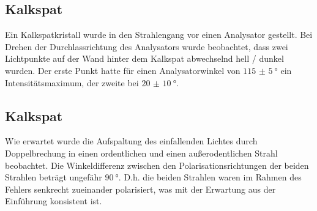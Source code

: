 \newpage
{}

\subsection{Kalkspat}
Ein Kalkspatkristall wurde in den Strahlengang vor einen Analysator gestellt. Bei Drehen der Durchlassrichtung des Analysators wurde beobachtet, dass zwei Lichtpunkte auf der Wand hinter dem Kalkspat abwechselnd hell / dunkel wurden. Der erste Punkt hatte für einen Analysatorwinkel von $\SI{115(5)}{\degree}$ ein Intensitätsmaximum, der zweite bei $\SI{20(10)}{\degree}$. 
\newpage
{}
\subsection{Kalkspat}
Wie erwartet wurde die Aufspaltung des einfallenden Lichtes durch Doppelbrechung in einen ordentlichen und einen außerodentlichen Strahl beobachtet. Die Winkeldifferenz zwischen den Polarisationsrichtungen der beiden Strahlen beträgt ungefähr $\SI{90}{\degree}$. D.h. die beiden Strahlen waren im Rahmen des Fehlers senkrecht zueinander polarisiert, was mit der Erwartung aus der Einführung konsistent ist.

